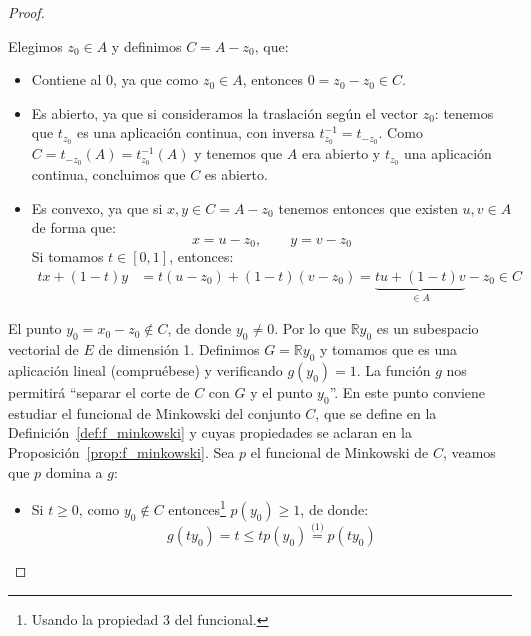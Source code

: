 \begin{teo}
\begin{proof}
\begin{description}
                Elegimos $z_0\in A$ y definimos $C = A-z_0$, que:
                \begin{itemize}
                    \item Contiene al $0$, ya que como $z_0 \in A$, entonces $0=z_0-z_0\in C$.
                    \item Es abierto, ya que si consideramos la traslación según el vector $z_0$:
                        tenemos que $t_{z_0}$ es una aplicación continua, con inversa $t^{-1}_{z_0}=t_{-z_0}$. Como $C = t_{-z_0}(A) = t^{-1}_{z_0}(A)$ y tenemos que $A$ era abierto y $t_{z_0}$ una aplicación continua, concluimos que $C$ es abierto.
                    \item Es convexo, ya que si $x,y\in C=A-z_0$ tenemos entonces que existen $u,v\in A$ de forma que:
                        \begin{equation*}
                            x = u-z_0, \qquad y = v-z_0
                        \end{equation*}
                        Si tomamos $t\in [0,1]$, entonces:
                        \begin{align*}
                            tx + (1-t)y &= t(u-z_0) + (1-t)(v-z_0) = \underbrace{tu + (1-t)v}_{\in A} - z_0 \in C
                        \end{align*}
                \end{itemize}
                El punto $y_0 = x_ 0 - z_0\notin C$, de donde $y_0 \neq 0$. Por lo que $\mathbb{R}y_0$ es un subespacio vectorial de $E$ de dimensión 1. Definimos $G = \mathbb{R} y_0$ y tomamos 
            que es una aplicación lineal (compruébese) y verificando $g(y_0) = 1$. La función $g$ nos permitirá ``separar el corte de $C$ con $G$ y el punto $y_0$''. En este punto conviene estudiar el funcional de Minkowski del conjunto $C$, que se define en la Definición~\ref{def:f_minkowski} y cuyas propiedades se aclaran en la Proposición~\ref{prop:f_minkowski}. Sea $p$ el funcional de Minkowski de $C$, veamos que $p$ domina a $g$:
                \begin{itemize}
                    \item Si $t\geq 0$, como $y_0\notin C$ entonces\footnote{Usando la propiedad 3 del funcional.} $p(y_0) \geq 1$, de donde:
                        \begin{equation*}
                            g(ty_0) = t \leq tp(y_0) \stackrel{\text{(1)}}{=} p(ty_0)
                        \end{equation*}

\end{itemize}
\end{description}
\end{proof}
\end{teo}
